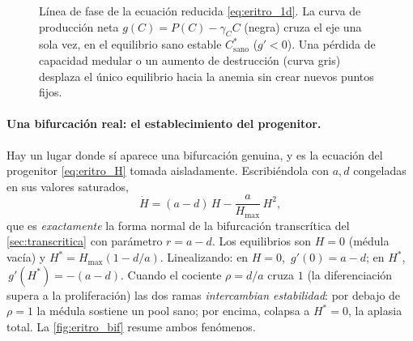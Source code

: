 \begin{figure}[htbp]
\centering
{}
\caption{Línea de fase de la ecuación reducida \eqref{eq:eritro_1d}. La curva de producción neta $g(C)=P(C)-\gamma_C C$ (negra) cruza el eje una sola vez, en el equilibrio sano estable $C^*_{\text{sano}}$ ($g'<0$). Una pérdida de capacidad medular o un aumento de destrucción (curva gris) desplaza el único equilibrio hacia la anemia sin crear nuevos puntos fijos.}
\label{fig:eritro_1d}
\end{figure}

\paragraph{Una bifurcación real: el establecimiento del progenitor.} Hay un lugar donde sí aparece una bifurcación genuina, y es la ecuación del progenitor \eqref{eq:eritro_H} tomada aisladamente. Escribiéndola con $a,d$ congeladas en sus valores saturados,
\begin{equation}
    \dot{H} = (a-d)\,H - \frac{a}{H_{\max}}\,H^2,
    \label{eq:eritro_transcritica}
\end{equation}
que es \emph{exactamente} la forma normal de la bifurcación transcrítica del \cref{sec:transcritica} con parámetro $r=a-d$. Los equilibrios son $H=0$ (médula vacía) y $H^*=H_{\max}(1-d/a)$. Linealizando: en $H=0$, $\,g'(0)=a-d$; en $H^*$, $\,g'(H^*)=-(a-d)$. Cuando el cociente $\rho=d/a$ cruza $1$ (la diferenciación supera a la proliferación) las dos ramas \emph{intercambian estabilidad}: por debajo de $\rho=1$ la médula sostiene un pool sano; por encima, colapsa a $H^*=0$, la aplasia total. La \cref{fig:eritro_bif} resume ambos fenómenos.

